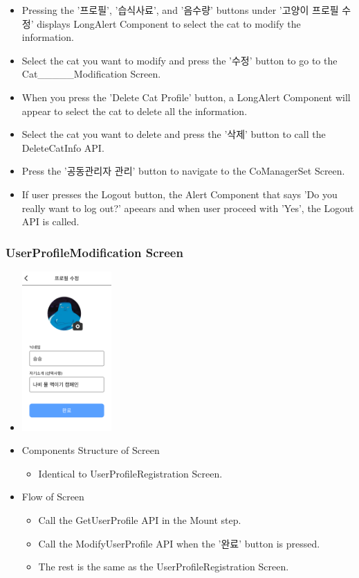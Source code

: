 \documentclass[conference]{IEEEtran}
\begin{document}
\begin{itemize}
\begin{itemize}
        \item Pressing the '프로필', '습식사료', and '음수량' buttons under '고양이 프로필 수정' displays LongAlert Component to select the cat to modify the information.
        \item Select the cat you want to modify and press the '수정' button to go to the Cat\_\_\_\_\_Modification Screen.
        \item When you press the 'Delete Cat Profile' button, a LongAlert Component will appear to select the cat to delete all the information.
        \item Select the cat you want to delete and press the '삭제' button to call the DeleteCatInfo API.
        \item Press the '공동관리자 관리' button to navigate to the CoManagerSet Screen.
        \item If user presses the Logout button, the Alert Component that says 'Do you really want to log out?' apeears and when user proceed with 'Yes', the Logout API is called.
    \end{itemize}
\end{itemize}
\newpage

\subsubsection{UserProfileModification Screen}
\begin{itemize}
    \item[] \includegraphics[width=0.27\textwidth]{img/D/18.png}
    \item Components Structure of Screen
    \begin{itemize}
        \item Identical to UserProfileRegistration Screen.
    \end{itemize}
    \item Flow of Screen
    \begin{itemize}
        \item Call the GetUserProfile API in the Mount step.
        \item Call the ModifyUserProfile API when the '완료' button is pressed.
        \item The rest is the same as the UserProfileRegistration Screen.
    \end{itemize}
\end{itemize}
\newpage
\end{document}
